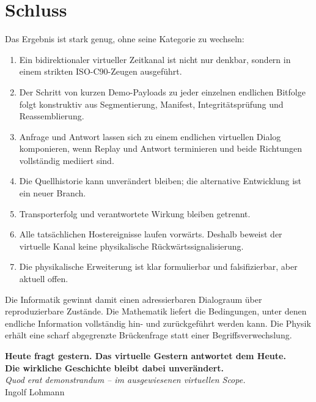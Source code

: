 \documentclass[11pt,a4paper]{article}
\theoremstyle{remark}
\begin{document}
\section{Schluss}

Das Ergebnis ist stark genug, ohne seine Kategorie zu wechseln:

\begin{enumerate}
  \item Ein bidirektionaler virtueller Zeitkanal ist nicht nur denkbar,
        sondern in einem strikten ISO-C90-Zeugen ausgeführt.
  \item Der Schritt von kurzen Demo-Payloads zu jeder einzelnen endlichen
        Bitfolge folgt konstruktiv aus Segmentierung, Manifest,
        Integritätsprüfung und Reassemblierung.
  \item Anfrage und Antwort lassen sich zu einem endlichen virtuellen Dialog
        komponieren, wenn Replay und Antwort terminieren und beide Richtungen
        vollständig mediiert sind.
  \item Die Quellhistorie kann unverändert bleiben; die alternative
        Entwicklung ist ein neuer Branch.
  \item Transporterfolg und verantwortete Wirkung bleiben getrennt.
  \item Alle tatsächlichen Hostereignisse laufen vorwärts. Deshalb beweist
        der virtuelle Kanal keine physikalische Rückwärtssignalisierung.
  \item Die physikalische Erweiterung ist klar formulierbar und
        falsifizierbar, aber aktuell offen.
\end{enumerate}

Die Informatik gewinnt damit einen adressierbaren Dialograum über
reproduzierbare Zustände. Die Mathematik liefert die Bedingungen, unter
denen endliche Information vollständig hin- und zurückgeführt werden kann.
Die Physik erhält eine scharf abgegrenzte Brückenfrage statt einer
Begriffsverwechslung.

\begin{center}
\large
\textbf{Heute fragt gestern. Das virtuelle Gestern antwortet dem Heute.}\\
\textbf{Die wirkliche Geschichte bleibt dabei unverändert.}\\[0.6em]
\textit{Quod erat demonstrandum -- im ausgewiesenen virtuellen Scope.}\\
Ingolf Lohmann
\end{center}
\end{document}
